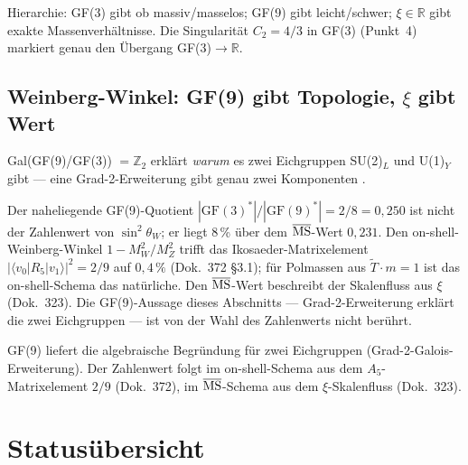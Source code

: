 \begin{keyresult}
Hierarchie: GF(3) gibt ob massiv/masselos; GF(9) gibt leicht/schwer;
$\xi\in\mathbb{R}$ gibt exakte Massenverhältnisse.
Die Singularität $C_2=4/3$ in GF(3) (Punkt~4) markiert genau den
Übergang GF(3)$\to\mathbb{R}$.
\end{keyresult}

\subsection{Weinberg-Winkel: GF(9) gibt Topologie, $\xi$ gibt Wert}

Gal(GF(9)/GF(3)) $= \mathbb{Z}_2$ erklärt \emph{warum} es zwei Eichgruppen
SU(2)$_L$ und U(1)$_Y$ gibt — eine Grad-2-Erweiterung gibt genau zwei
Komponenten \KM.

Der naheliegende GF(9)-Quotient $|\mathrm{GF}(3)^*|/|\mathrm{GF}(9)^*| = 2/8 = 0{,}250$
ist nicht der Zahlenwert von $\sin^2\theta_W$; er liegt 8\,\% über dem
$\overline{\rm MS}$-Wert $0{,}231$. Den on-shell-Weinberg-Winkel
$1-M_W^2/M_Z^2$ trifft das Ikosaeder-Matrixelement
$|\langle v_0|R_5|v_1\rangle|^2 = 2/9$ auf $0{,}4\,\%$ (Dok.~372 §3.1);
für Polmassen aus $\tilde T\cdot m=1$ ist das on-shell-Schema das natürliche.
Den $\overline{\rm MS}$-Wert beschreibt der Skalenfluss aus $\xi$ (Dok.~323).
Die GF(9)-Aussage dieses Abschnitts --- Grad-2-Erweiterung erklärt die zwei
Eichgruppen --- ist von der Wahl des Zahlenwerts nicht berührt.

\begin{keyresult}[Status~\KM]
GF(9) liefert die algebraische Begründung für zwei Eichgruppen
(Grad-2-Galois-Erweiterung). Der Zahlenwert folgt im on-shell-Schema aus dem
$A_5$-Matrixelement $2/9$ (Dok.~372), im $\overline{\rm MS}$-Schema aus dem
$\xi$-Skalenfluss (Dok.~323).
\end{keyresult}

\section{Statusübersicht}

